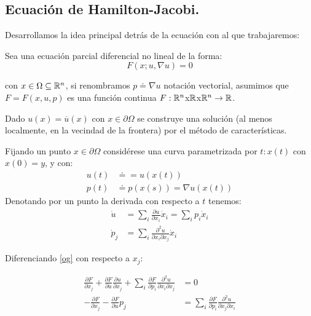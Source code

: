 \subsection{Ecuación de Hamilton-Jacobi.}

Desarrollamos la idea principal detrás de la ecuación con al que trabajaremos:

Sea una ecuación parcial diferencial no lineal \citep{evans} de la forma:
\begin{equation}\label{og}
	F(x;u,\nabla u)=0
\end{equation}

con $x\in\Omega\subseteq\mathbb{R}^n$, si renombramos $p\doteq\nabla u$ notación vectorial, asumimos que $F=F(x,u,p)$ es una función continua $F:\mathbb{R}^n$x$\mathbb{R}$x$\mathbb{R}^n \to \mathbb{R}$.

Dado $u(x)=\overline{u}(x)$ con $x\in\partial\Omega$ se construye una solución (al menos localmente, en la vecindad de la frontera) por el método de características.

Fijando un punto $x\in\partial\Omega$ considérese una curva parametrizada por $t:x(t)$ con $x(0)=y$, y con:
\begin{equation*}
	\begin{split}
		u(t) & \doteq=u(x(t))                \\
		p(t) & \doteq p(x(s))=\nabla u(x(t))
	\end{split}
\end{equation*}
Denotando por un punto la derivada con respecto a $t$ tenemos:
\begin{equation}\label{casi}
	\begin{split}
		\dot{u}  & =\sum_i \frac{\partial u}{\partial x_i}\dot x_i=\sum_i p_i \dot x_i \\
		\dot p_j & =\sum_i \frac{\partial^2 u}{\partial x_i\partial x_j} \dot x_i
	\end{split}
\end{equation}

Diferenciando \eqref{og} con respecto a $x_j$:

\begin{equation*}
	\begin{split}
		\frac{\partial F}{\partial x_j}+\frac{\partial F}{\partial u}\frac{\partial u}{\partial x_j}+\sum_i \frac{\partial F}{\partial p_i}\frac{\partial^2 u}{\partial x_i\partial x_j} & =0                                                                                   \\
		-\frac{\partial F}{\partial x_j}-\frac{\partial F}{\partial u}p_j                                                                                                                & =\sum_i \frac{\partial F}{\partial p_i}\frac{\partial^2 u}{\partial x_j\partial x_i}
	\end{split}
\end{equation*}


